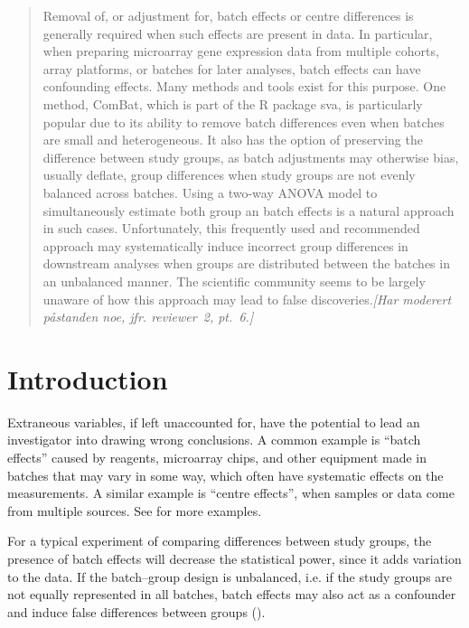 \documentclass{bio}
\newcommand\COMMENT[2]{\textcolor{COMMENTcol}{#1}\NOTE{#2}}
\newcommand\NB[1]{\textcolor{NBcol}{\textit{#1}}}
\newcommand\NOTE[1]{\NB{[#1]}}
\begin{document}
\begin{abstract}
{Removal of, or adjustment for, batch effects or centre differences is generally required when such effects are present in data. In particular, when preparing microarray gene expression data from multiple cohorts, array platforms, or batches for later analyses, batch effects can have confounding effects. Many methods and tools exist for this purpose. One method, ComBat, which is part of the R package sva, is particularly popular due to its ability to remove batch differences even when batches are small and heterogeneous. It also has the option of preserving the difference between study groups, as batch adjustments may otherwise bias, usually deflate, group differences when study groups are not evenly balanced across batches. Using a two-way ANOVA model to simultaneously estimate both group an batch effects is a natural approach in such cases. Unfortunately, this frequently used and recommended approach may systematically induce incorrect group differences in downstream analyses when groups are distributed between the batches in an unbalanced manner. \COMMENT{The scientific community seems to be largely unaware of how this approach may lead to false discoveries.}{Har moderert påstanden noe, jfr. reviewer~2, pt.~6.}
}
\end{abstract}


\section{Introduction}\label{intro}

Extraneous variables, if left unaccounted for, have the potential to lead an investigator into drawing wrong conclusions. A common example is ``batch effects'' caused by reagents, microarray chips, and other equipment made in batches that may vary in some way, which often have systematic effects on the measurements. A similar example is ``centre effects'', when samples or data come from multiple sources. See \citet{Luo2010} for more examples.

For a typical experiment of comparing differences between study groups, the presence of batch effects will decrease the statistical power, since it adds variation to the data. If the batch--group design is unbalanced, i.e. if the study groups are not equally represented in all batches, batch effects may also act as a confounder and induce false differences between groups (\citealp{Leek2010}).
\end{document}
